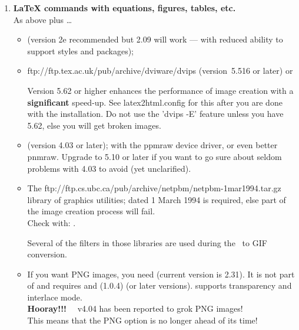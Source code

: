 \begin{enumerate}
%
%
%
\item
\textbf{\LaTeX{}  commands with equations, figures, tables, etc.} \\
As above plus \dots
%
\begin{itemize}
\item {} (version 2e recommended but 2.09 will work --- with
reduced ability to support styles and packages);
%
\item
{}
{ftp://ftp.tex.ac.uk/pub/archive/dviware/dvips}
(version~5.516 or later) or \\
\begin{changebar}
  Version 5.62 or higher enhances the performance of image creation
  with a {\bf significant} speed-up. See latex2html.config for this
  after you are done with the installation.
  Do not use the 'dvips -E' feature unless you have 5.62, else you
  will get broken images.
\end{changebar}
%
\item
{}\begin{changebar}
  (version 4.03 or later);
  with the ppmraw device driver, or even better pnmraw.
  Upgrade to 5.10 or later if you want to go sure about seldom problems
  with 4.03 to avoid (yet unclarified).
\end{changebar}
%
%
%
\item
{}\begin{changebar}
The 
{ftp://ftp.cs.ubc.ca/pub/archive/netpbm/netpbm-1mar1994.tar.gz}
library of graphics utilities;  dated 1 March 1994
is required, else part of the image creation process will fail.\\
Check with:  .
\end{changebar}

Several of the filters in those libraries are used during the \PS\ to
GIF conversion.
%
%
\item
{}\begin{changebar}
If you want PNG images, you need  (current version is 2.31).
It is not part of  and requires  and
 (1.0.4) (or later versions).
 supports transparency and interlace mode.\\
{\bf Hooray!!!}~~
 v4.04 has been reported to grok PNG images!\\
This means that the PNG option is no longer ahead of its time!
\end{changebar}
\end{itemize}



\end{enumerate}
